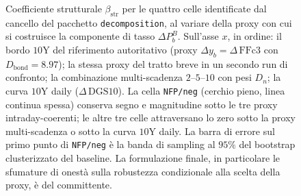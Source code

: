 \begin{figure}[t]
    \caption[Robustezza di $\beta_{\mathrm{str}}$ alla proxy della componente
             di tasso]{Coefficiente strutturale $\beta_{\mathrm{str}}$ per le
             quattro celle identificate dal cancello del pacchetto
             \texttt{decomposition}, al variare della proxy con cui si
             costruisce la componente di tasso $\Delta P^{B}_{b}$.
             Sull'asse $x$, in ordine: il bordo $10$Y del riferimento
             autoritativo (proxy $\Delta y_b = \Delta\,\mathrm{FFc3}$ con
             $D_{\mathrm{bond}}=8.97$); la stessa proxy del tratto breve in un
             secondo run di confronto; la combinazione multi-scadenza
             $2$--$5$--$10$ con pesi $D_n$; la curva $10$Y daily
             ($\Delta\,\mathrm{DGS10}$). La cella \texttt{NFP/neg} (cerchio
             pieno, linea continua spessa) conserva segno e magnitudine
             sotto le tre proxy intraday-coerenti; le altre tre celle
             attraversano lo zero sotto la proxy multi-scadenza o sotto la
             curva $10$Y daily. La barra di errore sul primo punto di
             \texttt{NFP/neg} \`e la banda di sampling al $95\%$ del bootstrap
             clusterizzato del baseline. La formulazione finale, in
             particolare le sfumature di onest\`a sulla robustezza
             condizionale alla scelta della proxy, \`e del committente.}
    \label{fig:robustezza_proxy}
\end{figure}



